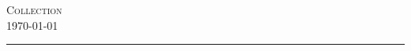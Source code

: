
\usepackage{amsmath, environ}
\usepackage[utf8]{inputenc}
\usepackage[english]{babel}
\usepackage{theorem}
\theoremstyle{break}



\begin{center}
{\Huge \textsc{Collection}}\\ \today
\end{center}
\tableofcontents


%
%
\hrule


